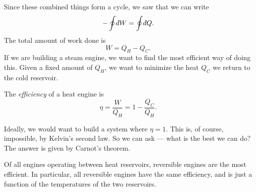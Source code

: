\documentclass[a4paper]{article}
\def\di{{\mathchar'26\mkern-12mu d}}
\begin{document}
Since these combined things form a cycle, we saw that we can write
\[
  - \oint \di W = \oint \di Q.
\]
The total amount of work done is
\[
  W = Q_H - Q_C.
\]
If we are building a steam engine, we want to find the most efficient way of doing this. Given a fixed amount of $Q_H$, we want to minimize the heat $Q_C$ we return to the cold reservoir.

\begin{defi}[Efficiency]
  The \emph{efficiency} of a heat engine is
  \[
    \eta = \frac{W}{Q_H} = 1 - \frac{Q_C}{Q_H}.
  \]
\end{defi}
Ideally, we would want to build a system where $\eta = 1$. This is, of course, impossible, by Kelvin's second law. So we can ask --- what is the best we can do? The answer is given by Carnot's theorem.

\begin{thm}
  Of all engines operating between heat reservoirs, reversible engines are the most efficient. In particular, all reversible engines have the same efficiency, and is just a function of the temperatures of the two reservoirs.
\end{thm}
\end{document}
